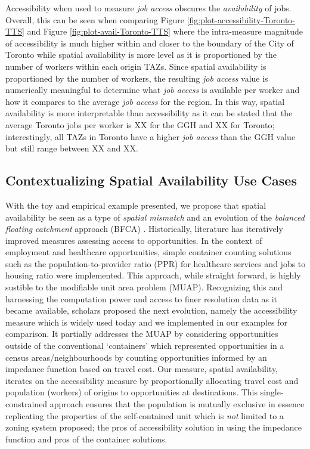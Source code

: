 \documentclass[]{elsarticle} %
\begin{document}
Accessibility when used to measure \emph{job access} obscures the
\emph{availability} of jobs. Overall, this can be seen when comparing
Figure \ref{fig:plot-accessibility-Toronto-TTS} and Figure
\ref{fig:plot-avail-Toronto-TTS} where the intra-measure magnitude of
accessibility is much higher within and closer to the boundary of the
City of Toronto while spatial availability is more level as it is
proportioned by the number of workers within each origin TAZs. Since
spatial availability is proportioned by the number of workers, the
resulting \emph{job access} value is numerically meaningful to determine
what \emph{job access} is available per worker and how it compares to
the average \emph{job access} for the region. In this way, spatial
availability is more interpretable than accessibility as it can be
stated that the average Toronto jobs per worker is XX for the GGH and XX
for Toronto; interestingly, all TAZs in Toronto have a higher \emph{job
access} than the GGH value but still range between XX and XX.

\hypertarget{contextualizing-spatial-availability-use-cases}{%
\subsection{Contextualizing Spatial Availability Use
Cases}\label{contextualizing-spatial-availability-use-cases}}

With the toy and empirical example presented, we propose that spatial
availability be seen as a type of \emph{spatial mismatch} and an
evolution of the \emph{balanced floating catchment} approach (BFCA) .
Historically, literature has iteratively improved measures assessing
access to opportunities. In the context of employment and healthcare
opportunities, simple container counting solutions such as the
population-to-provider ratio (PPR) for healthcare services and jobs to
housing ratio were implemented. This approach, while straight forward,
is highly sustible to the modifiable unit area problem (MUAP).
Recognizing this and harnessing the computation power and access to
finer resolution data as it became available, scholars proposed the next
evolution, namely the accessibility measure which is widely used today
and we implemented in our examples for comparison. It partially
addresses the MUAP by considering opportunities outside of the
conventional `containers' which represented opportunities in a census
areas/neighbourhoods by counting opportunities informed by an impedance
function based on travel cost. Our measure, spatial availability,
iterates on the accessibility measure by proportionally allocating
travel cost and population (workers) of origins to opportunities at
destinations. This single-constrained approach ensures that the
population is mutually exclusive in essence replicating the properties
of the self-contained unit which is \emph{not} limited to a zoning
system proposed; the pros of accessibility solution in using the
impedance function and pros of the container solutions.
\end{document}
